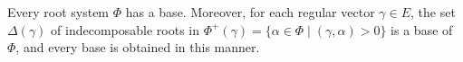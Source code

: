 Every root system $\Phi$ has a base. Moreover, for each regular vector $\gamma \in E$, the set $\Delta(\gamma)$ of indecomposable roots in $\Phi^+(\gamma) = \{\alpha \in \Phi \mid (\gamma, \alpha) > 0\}$ is a base of $\Phi$, and every base is obtained in this manner.
